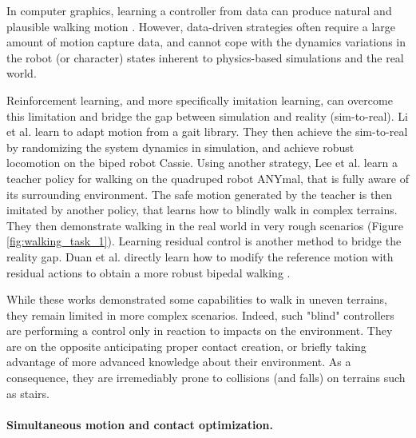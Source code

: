 In computer graphics, learning a controller from data can produce natural and plausible walking motion \cite{learned_motion_matching, pfnn}.
However, data-driven strategies often require a large amount of motion capture data, and cannot cope with the dynamics variations in the robot (or character) states inherent to physics-based simulations and the real world.

Reinforcement learning, and more specifically imitation learning, can overcome this limitation and bridge the gap between simulation and reality (sim-to-real).
Li et al. \cite{CassieLi2021} learn to adapt motion from a gait library. 
They then achieve the sim-to-real by randomizing the system dynamics in simulation, and achieve robust locomotion on the biped robot Cassie.
Using another strategy, Lee et al. \cite{hutter_challenging_terrain} learn a teacher policy for walking on the quadruped robot ANYmal, that is fully aware of its surrounding environment.
The safe motion generated by the teacher is then imitated by another policy, that learns how to blindly walk in complex terrains.
They then demonstrate walking in the real world in very rough scenarios (Figure \ref{fig:walking_task_1}).
Learning residual control is another method to bridge the reality gap. Duan et al. directly learn how to modify the reference motion with residual actions to obtain a more robust bipedal walking \cite{residual_rl_cassie_2021}.

While these works demonstrated some capabilities to walk in uneven terrains, they remain limited in more complex scenarios. 
Indeed, such "blind" controllers are performing a control only in reaction to impacts on the environment. They are on the opposite anticipating proper contact creation, or briefly taking advantage of more advanced knowledge about their environment. As a consequence, they are irremediably prone to collisions (and falls) on terrains such as stairs.

\paragraph{Simultaneous motion and contact optimization.\label{par:simul_contact_motion}}

